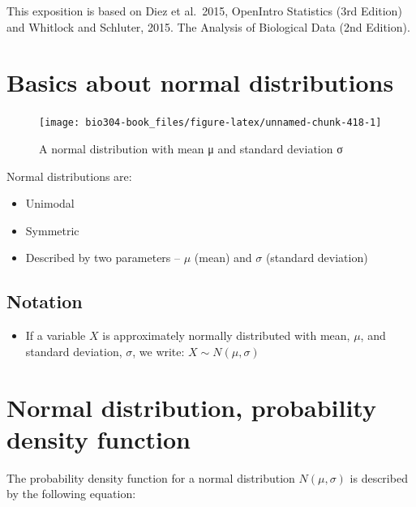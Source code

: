 \documentclass[]{book}
\providecommand{\tightlist}{%
  \setlength{\itemsep}{0pt}\setlength{\parskip}{0pt}}
\theoremstyle{definition}
\theoremstyle{definition}
\theoremstyle{definition}
\theoremstyle{remark}
\begin{document}
This exposition is based on Diez et al.~2015, OpenIntro Statistics (3rd
Edition) and Whitlock and Schluter, 2015. The Analysis of Biological
Data (2nd Edition).

\hypertarget{basics-about-normal-distributions}{%
\section{Basics about normal
distributions}\label{basics-about-normal-distributions}}

\begin{figure}

{\centering \texttt{[image: bio304-book\_files/figure-latex/unnamed-chunk-418-1]} 

}

\caption{A normal distribution with mean μ and standard deviation σ}\label{fig:unnamed-chunk-418}
\end{figure}

Normal distributions are:

\begin{itemize}
\tightlist
\item
  Unimodal
\item
  Symmetric
\item
  Described by two parameters -- \(\mu\) (mean) and \(\sigma\) (standard
  deviation)
\end{itemize}

\hypertarget{notation}{%
\subsection{Notation}\label{notation}}

\begin{itemize}
\tightlist
\item
  If a variable \(X\) is approximately normally distributed with mean,
  \(\mu\), and standard deviation, \(\sigma\), we write:
  \(X \sim N(\mu,\sigma)\)
\end{itemize}

\hypertarget{normal-distribution-probability-density-function}{%
\section{Normal distribution, probability density
function}\label{normal-distribution-probability-density-function}}

The probability density function for a normal distribution
\(N(\mu,\sigma)\) is described by the following equation:
\end{document}
